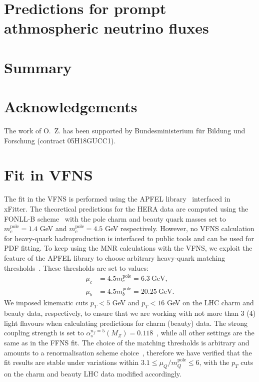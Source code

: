 \documentclass[12pt]{article}
\begin{document}
\section{Predictions for prompt athmospheric neutrino fluxes}
\label{sec:astro}

\section{Summary}
\label{sec:summary}

\section*{Acknowledgements}

The work of O.~Z. has been supported by Bundesministerium f\"ur Bildung und Forschung (contract 05H18GUCC1).





\clearpage
\appendix
\section{Fit in VFNS}
\label{sec:vfns}

The fit in the VFNS is performed using the APFEL library~\cite{Bertone:2013vaa} interfaced in xFitter.
The theoretical predictions for the HERA data are computed using the FONLL-B scheme~\cite{Forte:2010ta} with the pole charm and beauty quark masses set to $m_c^{\textrm{pole}} = 1.4$ GeV and $m_c^{\textrm{pole}} = 4.5$ GeV respectively.
However, no VFNS calculation for heavy-quark hadroproduction is interfaced to public tools and can be used for PDF fitting.
To keep using the MNR calculations with the VFNS, we exploit the feature of the APFEL library to choose arbitrary heavy-quark matching thresholds~\cite{Bertone:2017ehk}. These thresholds are set to values:
\begin{equation}
\begin{aligned}
\mu_c &= 4.5m_c^{\textrm{pole}} = 6.3~\textrm{GeV},\\
\mu_b &= 4.5m_b^{\textrm{pole}} =  20.25~\textrm{GeV}.
\end{aligned}
\end{equation}
We imposed kinematic cuts $p_T < 5$ GeV and $p_T < 16$ GeV on the LHC charm and beauty data, respectively, to ensure that we are working with not more than 3 (4) light flavours when calculating predictions for charm (beauty) data. The strong coupling strength is set to $\alpha_s^{n_f = 5}(M_Z) = 0.118$~\cite{Tanabashi:2018oca}, while all other settings are the same as in the FFNS fit.
The choice of the matching thresholds is arbitrary and amounts to a renormalisation scheme choice~\cite{Bertone:2017ehk}, therefore we have verified that the fit results are stable under variations within $3.1 \le \mu_Q/m_Q^{\textrm{pole}} \le 6$, with the $p_T$ cuts on the charm and beauty LHC data modified accordingly.
\end{document}

